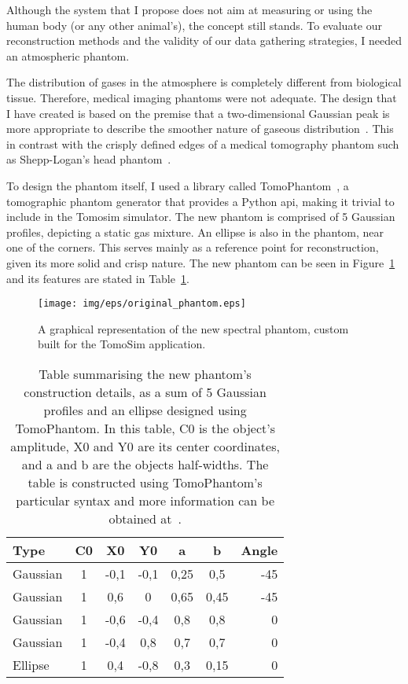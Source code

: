 Although the system that I propose does not aim at measuring or using
the human body (or any other animal's), the concept still stands. To
evaluate our reconstruction methods and the validity of our data
gathering strategies, I needed an atmospheric phantom.

The distribution of gases in the atmosphere is completely different from
biological tissue. Therefore, medical imaging phantoms were not
adequate. The design that I have created is based on the premise that a
two-dimensional Gaussian peak is more appropriate to describe the
smoother nature of gaseous distribution~\cite{Stachniss2009}. This in
contrast with the crisply defined edges of a medical tomography phantom
such as Shepp-Logan's head phantom~\cite{Shepp1974}.

To design the phantom itself, I used a library called
TomoPhantom~\cite{Kazantsev2018}, a tomographic phantom generator that
provides a Python \gls{api}, making it trivial to include in the Tomosim
simulator. The new phantom is comprised of 5 Gaussian profiles,
depicting a static gas mixture. An ellipse is also in the phantom, near
one of the corners. This serves mainly as a reference point for
reconstruction, given its more solid and crisp nature. The new phantom
can be seen in Figure~\ref{fig:new_phantom} and its features are stated
in Table~\ref{tab:new_phantom}.


\begin{figure}[htpb]
    \centering
    \texttt{[image: img/eps/original\_phantom.eps]}
    \caption{A graphical representation of the new spectral phantom,
    custom built for the TomoSim application.}
    \label{fig:new_phantom}
\end{figure}


\begin{table}[htpb]
    \centering
    \caption{Table summarising the new phantom's construction details,
    as a sum of 5 Gaussian profiles and an ellipse designed using
    TomoPhantom. In this table, C0 is the object's amplitude, X0 and Y0
    are its center coordinates, and a and b are the objects half-widths.
    The table is constructed using TomoPhantom's particular syntax and
    more information can be obtained at~\cite{Kazantsev2018}.}
    \label{tab:new_phantom}
    \begin{tabular}{@{}lcccccr@{}}
    \hline
    \textbf{Type} & \textbf{C0} & \textbf{X0} & \textbf{Y0} & \textbf{a}
                  & \textbf{b} & \textbf{\textbf{Angle}} \\ \hline
    Gaussian & 1 & -0,1 & -0,1 & 0,25 & 0,5 & -45 \\
    Gaussian & 1 & 0,6 & 0 & 0,65 & 0,45 & -45 \\
    Gaussian & 1 & -0,6 & -0,4 & 0,8 & 0,8 & 0 \\
    Gaussian & 1 & -0,4 & 0,8 & 0,7 & 0,7 & 0 \\
    Ellipse & 1 & 0,4 & -0,8 & 0,3 & 0,15 & 0 \\ \hline
    \end{tabular}
\end{table}

